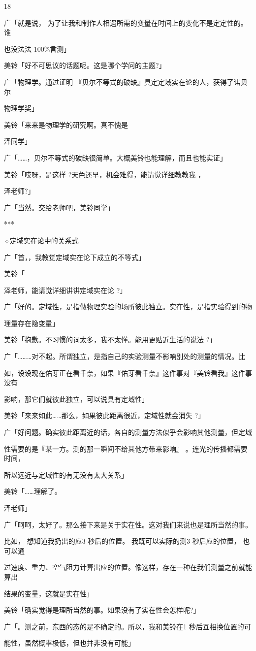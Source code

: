 18\par
广「就是说， 为了让我和制作人相遇所需的变量在时间上的变化不是定定性的。谁\par
也没法法 100\%言测」\par
美铃「好不可思议的话题呢。这是哪个学问的主题?」\par
广「物理学。通过证明 『贝尔不等式的破缺』具定定域实在论的人，获得了诺贝尔\par
物理学奖」\par
美铃「来来是物理学的研究啊。真不愧是\par
泽同学」\par
广「……，贝尔不等式的破缺很简单。大概美铃也能理解，而且也能实证」\par
美铃「哎呀，是这样 ?天色还早，机会难得，能请觉详细教教我 ，\par
泽老师?」\par
广「当然。交给老师吧，美铃同学」\par
***\par
$\diamond$定域实在论中的关系式\par
广「首，，我教觉定域实在论下成立的不等式」\par
美铃「\par
泽老师，能请觉详细讲讲定域实在论 ?」\par
广「好的。定域性，是指做物理实验的场所彼此独立。实在性，是指实验得到的物\par
理量存在隐变量」\par
美铃「抱歉。不习惯的词太多，我不太懂。能用更贴近生活的说法 ?」\par
广「………对不起。所谓独立，是指自己的实验测量不影响别处的测量的情况。比\par
如，设设现在佑芽正在看千奈，如果『佑芽看千奈』这件事对『美铃看我』这件事没有\par
影响，那它们就彼此独立，可以说具有定域性」\par
美铃「来来如此……那么，如果彼此距离很近，定域性就会消失 ?」\par
广「好问题。确实彼此距离近的话，各自的测量方法似乎会影响其他测量，但定域\par
性需要的是『某一方。测的那一瞬间不给其他方带来影响』 。连光的传播都需要时间，\par
所以远近与定域性的有无没有太大关系」\par
美铃「……理解了。\par
泽老师」\par
广「呵呵，太好了。那么接下来是关于实在性。这对我们来说也是理所当然的事。\par
比如， 想知道我扔出的应3 秒后的位置。 我既可以实际的测3 秒后应的位置， 也可以通\par
过速度、重力、空气阻力计算出应的位置。像这样，存在一种在我们测量之前就能算出\par
结果的变量，这就是实在性」\par
美铃「确实觉得是理所当然的事。如果没有了实在性会怎样呢?」\par
广「。测之前，东西的态的是不确定的。所以，我和美铃在1 秒后互相换位置的可\par
能性，虽然概率极低，但也并非没有可能」\par

